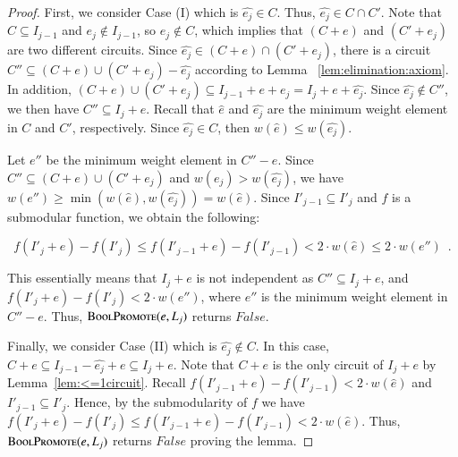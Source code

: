 \documentclass[11pt]{article}
\newcommand{\boolsuit}{\textsc{BoolPromote}}
\begin{document}
\begin{proof}
First, we consider Case (I) which is $\hat{e_j} \in C$. 
Thus, $\hat{e_j} \in C\cap C'$. 
Note that $C \subseteq I_{j-1}$ 
and $e_j \notin I_{j-1}$, so $e_j \notin C$, which implies that $(C + e)$ and $(C' + e_j)$ are two different circuits.
Since $\hat{e_j} \in (C+e)\cap (C'+e_j)$, 
there is a circuit $C'' \subseteq (C+e) \cup (C'+e_j) - {\hat{e_j}}$ 
according to Lemma ~\ref{lem:elimination:axiom}. 
In addition, 
$(C+e) \cup (C'+e_j) \subseteq I_{j-1} + e + e_j = I_j +e + \hat{e_j}$. 
    Since $\hat{e_j} \notin C''$, we then have $C'' \subseteq I_j + e$.
    Recall that $\hat{e}$ and $\hat{e_j}$ are the minimum weight element in $C$ and $C'$, 
    respectively. Since $\hat{e_j} \in C$, then $w(\hat{e})\leq w(\hat{e_j})$. 

    Let $e''$ be the minimum weight element in $C''-e$.
    Since $C'' \subseteq (C+e) \cup (C'+e_j)$  and $w(e_j) > w(\hat{e_j})$, 
    we have $w(e'') \geq \min(w(\hat{e}), w(\hat{e_j})) = w(\hat{e})$.
    Since $I'_{j-1} \subseteq I'_{j}$ and $f$ is a submodular function, 
    we obtain the following: 

   $$
    f(I'_{j} + e) - f(I'_{j}) \leq
    f(I'_{j-1} + e) - f(I'_{j-1}) <
    2\cdot w(\hat{e}) \leq
    2\cdot w(e'') \enspace.
    $$

This essentially means that $I_{j} + e$ is not independent as $C'' \subseteq I_{j} + e$, and
     $f(I'_j + e) - f(I'_j) < 2\cdot w(e'')$, 
    where $e''$ is the minimum weight element in  $C'' - e$. 
    Thus, $\boolsuit(e,L_{j})$ returns $False$. 

Finally, we consider  Case (II) which is $\hat{e_j} \notin C$. 
In this case, $C+e \subseteq I_{j-1}-{\hat{e_j}} + e \subseteq I_j + e$. 
Note that $C+e$ is the only circuit of $ I_j + e$ by Lemma~\ref{lem:<=1circuit}. 
Recall $f(I'_{j-1} + e) - f(I'_{j-1}) < 2\cdot w(\hat{e})$ and $I'_{j-1} \subseteq I'_{j}$. 
Hence, by the submodularity of $f$ we have
$f(I'_{j} + e) - f(I'_{j}) \leq
f(I'_{j-1} + e) - f(I'_{j-1}) <
2\cdot w(\hat{e})$. 
Thus, $\boolsuit(e,L_{j})$ returns $False$ proving the lemma.
\end{proof}
\end{document}
